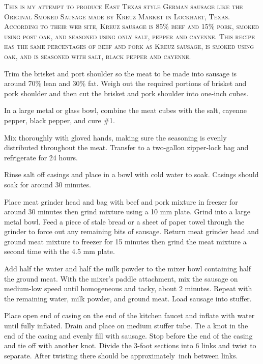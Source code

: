 \documentclass[letterpaper]{recipePMG}
\newcommand{\threequarters}{\nicefrac{3}{4} \,}
\begin{document}

\textsc{This is my attempt to produce East Texas style German sausage like the Original Smoked Sausage made by Kreuz Market in Lockhart, Texas. According to their web site, Kreuz sausage is 85\% beef and 15\% pork, smoked using post oak, and seasoned using only salt, pepper and cayenne. This recipe has the same percentages of beef and pork as Kreuz sausage, is smoked using oak, and is seasoned with salt, black pepper and cayenne.}

Trim the brisket and port shoulder so the meat to be made into sausage is around 70\% lean and 30\% fat. Weigh out the required portions of brisket and pork shoulder and then
cut the brisket and pork shoulder into one-inch cubes. 

In a large metal or glass bowl, combine the meat cubes with the salt, cayenne pepper, black pepper, and cure \#1.

Mix thoroughly with gloved hands, making sure the seasoning is evenly distributed throughout the meat. Transfer to a two-gallon zipper-lock bag and refrigerate for 24 hours.

Rinse salt off casings and place in a bowl with cold water to soak.  Casings should soak for around 30 minutes.

Place meat grinder head and bag with beef and pork mixture in freezer for around 30 minutes then grind mixture using a 10 mm plate. Grind into a large metal bowl. Feed a piece of stale bread or a sheet of paper towel through the grinder to force out any remaining bits of sausage. Return meat grinder head and ground meat mixture to freezer for 15 minutes then grind the meat mixture a second time with the 4.5 mm plate.

Add half the water and half the milk powder to the mixer bowl containing half the ground meat. With the mixer's paddle attachment, mix the sausage on medium-low speed until homogeneous and tacky, about 2 minutes. Repeat with the remaining water, milk powder, and ground meat. Load sausage into stuffer. 

Place open end of casing on the end of the kitchen faucet and inflate with water until fully inflated. Drain and place on medium stuffer tube. Tie a knot in the end of the casing and evenly fill with sausage. Stop before the end of the casing and tie off with another knot.  Divide the 3-foot sections into 6 links and twist to separate. After twisting there should be approximately \threequarters inch between links. 
\end{document}
